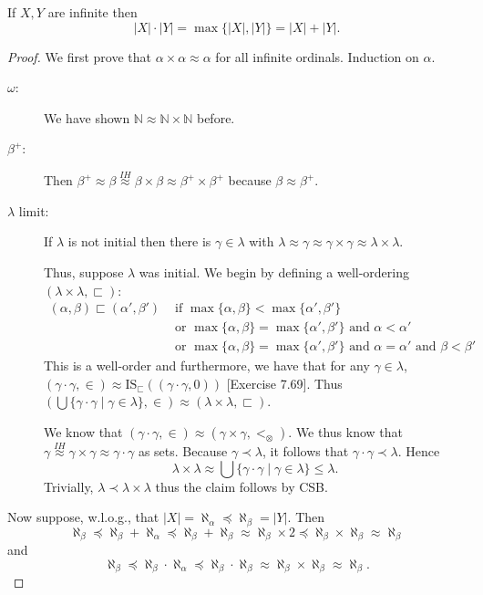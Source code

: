 \documentclass{whrartcl}
\newcommand{\NN}{\mathbb{N}}
\newcommand{\IS}{\text{IS}}
\newcommand{\abs}[1]{|#1|}
\begin{document}
\begin{theorem}
  If $X, Y$ are infinite then
  \[
    \abs{X} \cdot \abs{Y} = \max \{\abs{X}, \abs{Y}\} = \abs{X} + \abs{Y}.
  \]
\end{theorem}
\begin{proof}
  We first prove that $\alpha \times \alpha \approx \alpha$ for all infinite
  ordinals. Induction on $\alpha$.
  \begin{description}
  \item[$\omega$:] We have shown $\NN \approx \NN \times \NN$ before.
  \item[$\beta^+$:] Then $\beta^+ \approx \beta \stackrel{IH}{\approx} \beta \times \beta
    \approx \beta^+ \times \beta^+$ because $\beta \approx \beta^+$.
  \item[$\lambda$ limit:] If $\lambda$ is not initial then there is $\gamma \in
    \lambda$ with $\lambda \approx \gamma \approx \gamma \times \gamma \approx
    \lambda \times \lambda$.

    Thus, suppose $\lambda$ was initial. We begin by defining a well-ordering $(\lambda
    \times \lambda, \sqsubset)$:
    \begin{align*}
      (\alpha, \beta) \sqsubset (\alpha', \beta') & \text{ if } \max \{\alpha, \beta\} < \max \{\alpha', \beta'\} \\      & \text{ or } \max \{\alpha, \beta\} = \max \{\alpha', \beta'\} \text{ and } \alpha < \alpha' \\
      & \text{ or } \max \{\alpha, \beta\} = \max \{\alpha', \beta'\} \text{ and } \alpha = \alpha' \text{ and } \beta < \beta'
    \end{align*}
    This is a well-order and furthermore, we have that for any $\gamma \in \lambda$,
    $(\gamma \cdot \gamma, \in) \approx \IS_{\sqsubset}((\gamma \cdot \gamma, 0))$
    [Exercise 7.69]. Thus $(\bigcup \{\gamma \cdot \gamma \mid \gamma \in
    \lambda\}, \in) \approx (\lambda \times \lambda, \sqsubset)$.

    We know that $(\gamma \cdot \gamma, \in) \approx (\gamma \times \gamma,
    <_\otimes)$. We thus know that $\gamma \stackrel{IH}{\approx} \gamma \times \gamma \approx
    \gamma \cdot \gamma$ as sets. Because $\gamma \prec \lambda$, it follows
    that $\gamma \cdot \gamma \prec \lambda$. Hence
    \[
      \lambda \times \lambda \approx \bigcup \{\gamma \cdot \gamma \mid \gamma
      \in \lambda\} \leq \lambda.
    \]
    Trivially, $\lambda \prec \lambda \times \lambda$ thus the claim follows by CSB.
  \end{description}

  Now suppose, w.l.o.g., that $\abs{X} = \aleph_\alpha \preceq \aleph_\beta = \abs{Y}$. Then
  \[
    \aleph_\beta \preceq \aleph_\beta + \aleph_\alpha \preceq \aleph_\beta +
    \aleph_\beta \approx \aleph_\beta \times 2 \preceq \aleph_\beta \times \aleph_\beta \approx \aleph_\beta
  \]
  and
  \[
    \aleph_\beta \preceq \aleph_\beta \cdot \aleph_\alpha \preceq \aleph_\beta \cdot \aleph_\beta \approx \aleph_\beta \times \aleph_\beta \approx \aleph_\beta.
  \]
\end{proof}
\end{document}
